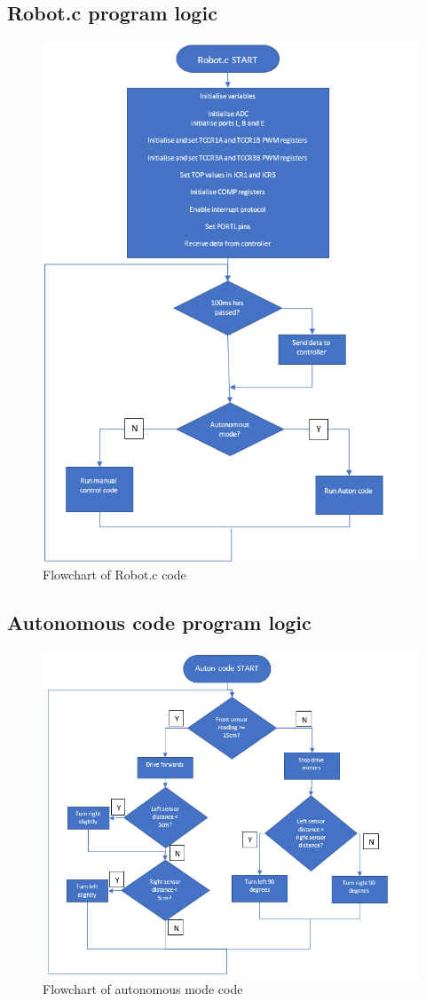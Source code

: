 \documentclass[12pt, a4paper]{article}
\begin{document}
  \subsection{Robot.c program logic}
  \begin{figure}[h]
    \includegraphics[width=0.7\columnwidth]{Images/robot_c.png}
    \centering
    \caption{Flowchart of Robot.c code}
    \label{fig:Flowchart:robot_c}
  \end{figure}

  \subsection{Autonomous code program logic}
  \begin{figure}[h]
    \includegraphics[width=0.9\columnwidth]{Images/auton.png}
    \centering
    \caption{Flowchart of autonomous mode code}
    \label{fig:Flowchart:auton}
  \end{figure}
  
\end{document}
